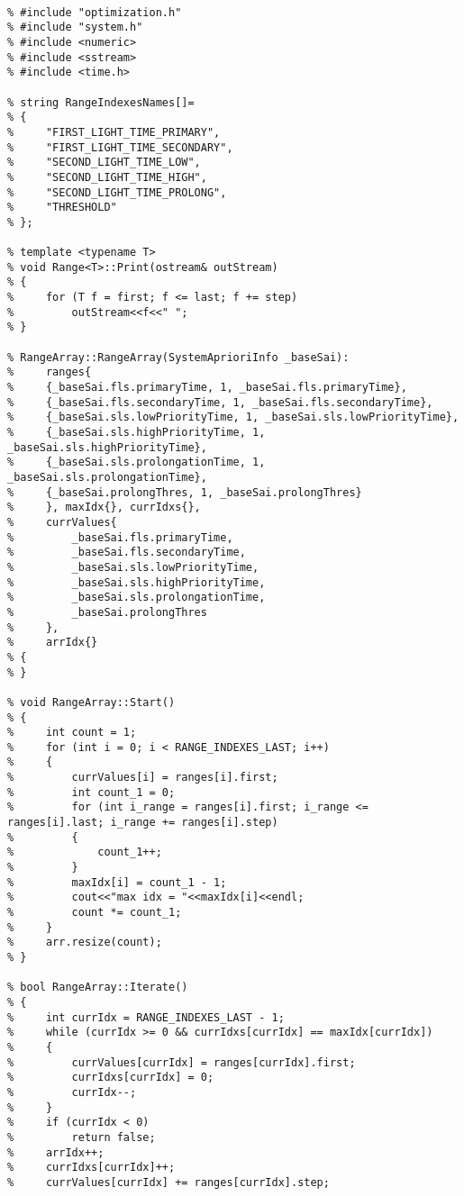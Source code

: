     \begin{lstlisting}[language={[ISO]C++}]

% #include "optimization.h"
% #include "system.h"
% #include <numeric>
% #include <sstream>
% #include <time.h>

% string RangeIndexesNames[]=
% {
%     "FIRST_LIGHT_TIME_PRIMARY",
%     "FIRST_LIGHT_TIME_SECONDARY",
%     "SECOND_LIGHT_TIME_LOW",
%     "SECOND_LIGHT_TIME_HIGH",
%     "SECOND_LIGHT_TIME_PROLONG",
%     "THRESHOLD"
% };

% template <typename T>
% void Range<T>::Print(ostream& outStream)
% {
%     for (T f = first; f <= last; f += step)
%         outStream<<f<<" ";
% }

% RangeArray::RangeArray(SystemAprioriInfo _baseSai):
%     ranges{
%     {_baseSai.fls.primaryTime, 1, _baseSai.fls.primaryTime},
%     {_baseSai.fls.secondaryTime, 1, _baseSai.fls.secondaryTime},
%     {_baseSai.sls.lowPriorityTime, 1, _baseSai.sls.lowPriorityTime},
%     {_baseSai.sls.highPriorityTime, 1, _baseSai.sls.highPriorityTime},
%     {_baseSai.sls.prolongationTime, 1, _baseSai.sls.prolongationTime},
%     {_baseSai.prolongThres, 1, _baseSai.prolongThres}
%     }, maxIdx{}, currIdxs{},
%     currValues{
%         _baseSai.fls.primaryTime,
%         _baseSai.fls.secondaryTime,
%         _baseSai.sls.lowPriorityTime,
%         _baseSai.sls.highPriorityTime,
%         _baseSai.sls.prolongationTime,
%         _baseSai.prolongThres
%     },
%     arrIdx{}
% {
% }

% void RangeArray::Start()
% {
%     int count = 1;
%     for (int i = 0; i < RANGE_INDEXES_LAST; i++)
%     {
%         currValues[i] = ranges[i].first;
%         int count_1 = 0;
%         for (int i_range = ranges[i].first; i_range <= ranges[i].last; i_range += ranges[i].step)
%         {
%             count_1++;
%         }
%         maxIdx[i] = count_1 - 1;
%         cout<<"max idx = "<<maxIdx[i]<<endl;
%         count *= count_1;
%     }
%     arr.resize(count);
% }

% bool RangeArray::Iterate()
% {
%     int currIdx = RANGE_INDEXES_LAST - 1;
%     while (currIdx >= 0 && currIdxs[currIdx] == maxIdx[currIdx])
%     {
%         currValues[currIdx] = ranges[currIdx].first;
%         currIdxs[currIdx] = 0;
%         currIdx--;
%     }
%     if (currIdx < 0)
%         return false;
%     arrIdx++;
%     currIdxs[currIdx]++;
%     currValues[currIdx] += ranges[currIdx].step;


\end{lstlisting}
